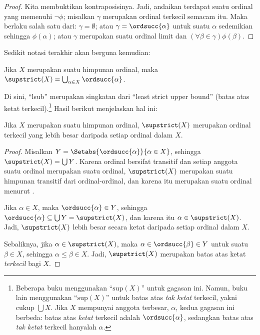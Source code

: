 \documentclass[../../../include/open-logic-section]{subfiles}
\begin{document}
\begin{proof}
Kita membuktikan kontraposisinya. Jadi, andaikan terdapat suatu ordinal yang
memenuhi $\lnot\phi$; misalkan $\gamma$ merupakan ordinal terkecil semacam
itu. Maka berlaku salah satu dari: $\gamma = \emptyset$; atau $\gamma =
\ordsucc{\alpha}$ untuk suatu $\alpha$ sedemikian sehingga $\phi(\alpha)$;
atau $\gamma$ merupakan suatu ordinal limit dan $(\forall \beta \in
\gamma)\phi(\beta)$.
\end{proof}
\noindent
Sedikit notasi terakhir akan berguna kemudian:

\begin{defn}
Jika $X$ merupakan suatu himpunan ordinal, maka $\supstrict(X) =
\bigcup_{\alpha \in X} \ordsucc{\alpha}$.
\end{defn}
\noindent
Di sini, ``lsub'' merupakan singkatan dari ``least strict upper bound''
(batas atas ketat terkecil).\footnote{Beberapa buku menggunakan
``$\text{sup}(X)$'' untuk gagasan ini. Namun, buku lain menggunakan
``$\text{sup}(X)$'' untuk batas atas \emph{tak ketat} terkecil, yakni cukup
$\bigcup X$. Jika $X$ mempunyai anggota terbesar, $\alpha$, kedua
gagasan ini berbeda: batas atas \emph{ketat} terkecil adalah
$\ordsucc{\alpha}$, sedangkan batas atas \emph{tak ketat} terkecil hanyalah
$\alpha$.} Hasil berikut menjelaskan hal ini:

\begin{prop}
Jika $X$ merupakan suatu himpunan ordinal, $\supstrict(X)$ merupakan ordinal
terkecil yang lebih besar daripada setiap ordinal dalam $X$.
\end{prop}

\begin{proof}
Misalkan $Y = \Setabs{\ordsucc{\alpha}}{\alpha \in X}$, sehingga
$\supstrict(X) = \bigcup Y$. Karena ordinal bersifat transitif dan setiap
anggota suatu ordinal merupakan suatu ordinal, $\supstrict(X)$ merupakan
suatu himpunan transitif dari ordinal-ordinal, dan karena itu merupakan suatu
ordinal menurut .

Jika $\alpha \in X$, maka $\ordsucc{\alpha} \in Y$, sehingga
$\ordsucc{\alpha} \subseteq \bigcup Y = \supstrict(X)$, dan karena itu
$\alpha \in \supstrict(X)$. Jadi, $\supstrict(X)$ lebih besar secara ketat
daripada setiap ordinal dalam $X$.

Sebaliknya, jika $\alpha \in \supstrict(X)$, maka $\alpha \in
\ordsucc{\beta} \in Y$ untuk suatu $\beta \in X$, sehingga $\alpha \leq
\beta \in X$. Jadi, $\supstrict(X)$ merupakan batas atas ketat
\emph{terkecil} bagi $X$.
\end{proof}
\end{document}
